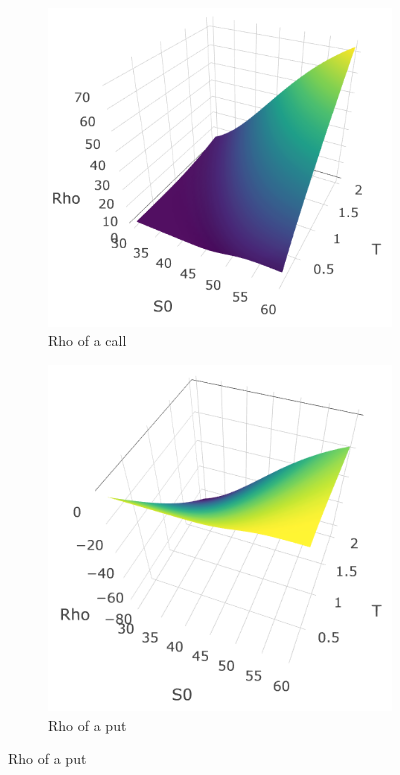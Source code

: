 \documentclass[hidelinks]{article}
\begin{document}
    \begin{figure}[!h]
	\centering
	\caption{Rho surfaces}
  \begin{subfigure}[b]{0.45\textwidth}
    \includegraphics[width=\textwidth]{rho_call.png}
    \caption{Rho of a call}
    \label{fig:Rho_call}
  \end{subfigure}
  \begin{subfigure}[b]{0.45\textwidth}
    \includegraphics[width=\textwidth]{rho_put.png}
    \caption{Rho of a put}
    \label{fig:rho_put}
  \end{subfigure}
\end{figure}
\end{document}
